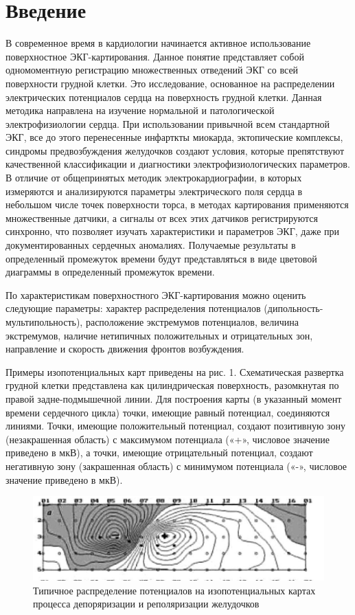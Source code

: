\section{Введение}
В современное время в кардиологии начинается активное использование поверхностное ЭКГ-картирования. 
Данное понятие представляет собой одномоментную регистрацию множественных отведений ЭКГ со всей поверхности грудной клетки.
Это исследование, основанное на распределении электрических потенциалов сердца на поверхность грудной клетки.
Данная методика направлена на изучение нормальной и патологической электрофизиологии сердца.
При использовании привычной всем стандартной ЭКГ, все до этого перенесенные инфарткты миокарда, эктопические комплексы,
синдромы предвозбуждения желудочков создают условия, которые препятствуют качественной классификации и диагностики электрофизиологических параметров.
В отличие от общепринятых методик электрокардиографии, в которых измеряются и анализируются параметры
электрического поля сердца в небольшом числе точек поверхности торса, в методах картирования применяются множественные датчики, 
а сигналы от всех этих датчиков регистрируются синхронно, что позволяет изучать характеристики и параметров ЭКГ, 
даже при документированных сердечных аномалиях. Получаемые результаты в определенный промежуток времени
будут представляться в виде цветовой диаграммы в определенный промежуток времени.

По характеристикам поверхностного ЭКГ-картирования можно оценить
следующие параметры: характер распределения потенциалов (дипольность-
мультипольность), расположение экстремумов потенциалов, величина
экстремумов, наличие нетипичных положительных и отрицательных зон,
направление и скорость движения фронтов возбуждения.

Примеры изопотенциальных карт приведены на рис. 1. Схематическая
развертка грудной клетки представлена как цилиндрическая поверхность,
разомкнутая по правой задне-подмышечной линии. Для построения карты (в
указанный момент времени сердечного цикла) точки, имеющие равный
потенциал, соединяются линиями. Точки, имеющие положительный
потенциал, создают позитивную зону (незакрашенная область) с
максимумом потенциала («+», числовое значение приведено в мкВ), а точки,
имеющие отрицательный потенциал, создают негативную зону (закрашенная
область) с минимумом потенциала («-», числовое значение приведено в
мкВ).



\begin{figure}[ht!]
\begin{center}
\includegraphics[scale=0.5]{ris1}
\end{center}
\caption{Типичное распределение потенциалов на изопотенциальных картах процесса депоряризации и реполяризации желудочков}\label{ris1}
\end{figure}

